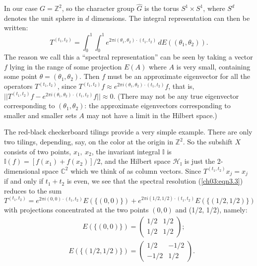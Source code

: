 \documentclass[reqno]{stml-l}
\theoremstyle{plain}
\theoremstyle{definition}
\numberwithin{equation}{chapter}
\begin{document}
In our case $G=\mathbb{Z}^{2}$, so the character group $\hat{G}$ is the torus $S^{1}\times S^{1}$, where $S^{d}$ denotes the unit sphere in $d$ dimensions. The integral representation can then be written:
\begin{equation}
T^{(t_{1},t_{2})}=\int_{0}^{1}\int_{0}^{1}e^{2\pi i(\theta_{1},\theta_{2})\cdot(t_{1},t_{2})}\,dE((\theta_{1}, \theta_{2})).\label{ch03:eqn3.3}
\end{equation}
The reason we call this a ``spectral representation'' can be seen by taking a vector $f$ lying in the range of some projection $E(A)$ where $A$ is very small, containing some point $\theta=(\theta_{1}, \theta_{2})$. Then $f$ must be an approximate eigenvector for all the operators $T^{(t_{1},t_{2})}$, since $T^{(t_{1},t_{2})}f\approx e^{2\pi i(\theta_{1},\theta_{2})\cdot(t_{1},t_{2})}f$, that is, $||T^{(t_{1},t_{2})}f-e^{2\pi i(\theta_{1},\theta_{2})\cdot(t_{1},t_{2})}f||\approx 0$. (There may not be any true eigenvector corresponding to $(\theta_{1}, \theta_{2})$: the approximate eigenvectors corresponding to smaller and smaller sets $A$ may not have a limit in the Hilbert space.)

The red-black checkerboard tilings provide a very simple example. There are only two tilings, depending, say, on the color at the origin in $\mathbb{Z}^{2}.$ So the subshift $X$ consists of two points, $x_{1},\ x_{2}$, the invariant integral $\mathbb{I}$ is $\mathbb{I}(f)=[f(x_{1})+f(x_{2})]/2$, and the Hilbert space $\mathcal{H}_{\mathbb{I}}$ is just the 2-dimensional space $\mathbb{C}^{2}$ which we think of as column vectors. Since $T^{(t_{1},t_{2})}x_{j}=x_{j}$ if and only if $t_{1}+t_{2}$ is even, we see that the spectral resolution (\ref{ch03:eqn3.3}) reduces to the sum
\begin{equation}
T^{(t_{1},t_{2})}=e^{2\pi i(0,0)\cdot(t_{1},t_{2})}E(\{(0,0)\})+e^{2\pi i(1/2,1/2)\cdot(t_{1},t_{2})}E(\{(1/2,1/2)\})\label{ch03:eqn3.4}
\end{equation}
with projections concentrated at the two points $(0,0)$ and (1/2, 1/2), namely:
\begin{equation}
\begin{split}
&\qquad E(\{(0,0)\})=\left(\begin{matrix} 1/2 & 1/2\\ 1/2 & 1/2
\end{matrix}\right);\\
&E(\{(1/2,1/2)\})=\left(\begin{matrix} 1/2 & -1/2\\ -1/2 & 1/2
\end{matrix}\right).
\end{split}\label{ch03:eqn3.5}
\end{equation}
\end{document}

